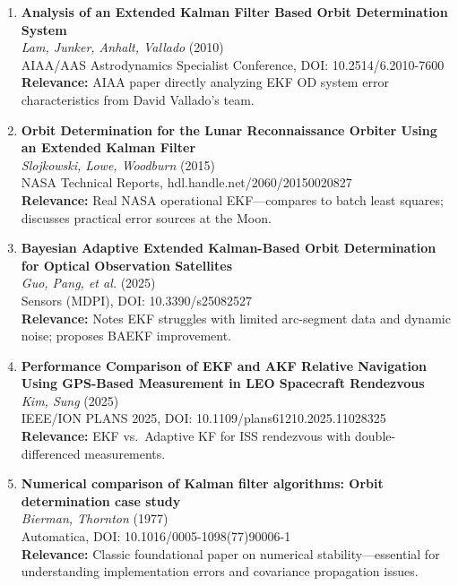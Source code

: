 \documentclass[11pt]{article}
\begin{document}
\begin{enumerate}[label=\textbf{\arabic*.},resume]
    \item \textbf{Analysis of an Extended Kalman Filter Based Orbit Determination System}\\
    \textit{Lam, Junker, Anhalt, Vallado} (2010)\\
    AIAA/AAS Astrodynamics Specialist Conference, DOI: 10.2514/6.2010-7600\\
    \textbf{Relevance:} AIAA paper directly analyzing EKF OD system error characteristics from David Vallado's team.

    \item \textbf{Orbit Determination for the Lunar Reconnaissance Orbiter Using an Extended Kalman Filter}\\
    \textit{Slojkowski, Lowe, Woodburn} (2015)\\
    NASA Technical Reports, hdl.handle.net/2060/20150020827\\
    \textbf{Relevance:} Real NASA operational EKF---compares to batch least squares; discusses practical error sources at the Moon.

    \item \textbf{Bayesian Adaptive Extended Kalman-Based Orbit Determination for Optical Observation Satellites}\\
    \textit{Guo, Pang, et al.} (2025)\\
    Sensors (MDPI), DOI: 10.3390/s25082527\\
    \textbf{Relevance:} Notes EKF struggles with limited arc-segment data and dynamic noise; proposes BAEKF improvement.

    \item \textbf{Performance Comparison of EKF and AKF Relative Navigation Using GPS-Based Measurement in LEO Spacecraft Rendezvous}\\
    \textit{Kim, Sung} (2025)\\
    IEEE/ION PLANS 2025, DOI: 10.1109/plans61210.2025.11028325\\
    \textbf{Relevance:} EKF vs.\ Adaptive KF for ISS rendezvous with double-differenced measurements.

    \item \textbf{Numerical comparison of Kalman filter algorithms: Orbit determination case study}\\
    \textit{Bierman, Thornton} (1977)\\
    Automatica, DOI: 10.1016/0005-1098(77)90006-1\\
    \textbf{Relevance:} Classic foundational paper on numerical stability---essential for understanding implementation errors and covariance propagation issues.
\end{enumerate}
\end{document}
